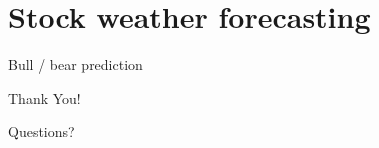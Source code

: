 \documentclass{beamer}
\begin{document}
\section{Stock weather forecasting}
\begin{frame}{Bull / bear prediction}
\end{frame}


\begin{frame}{Thank You!}
    \begin{center}
        Questions?
    \end{center}
\end{frame}
\end{document}
